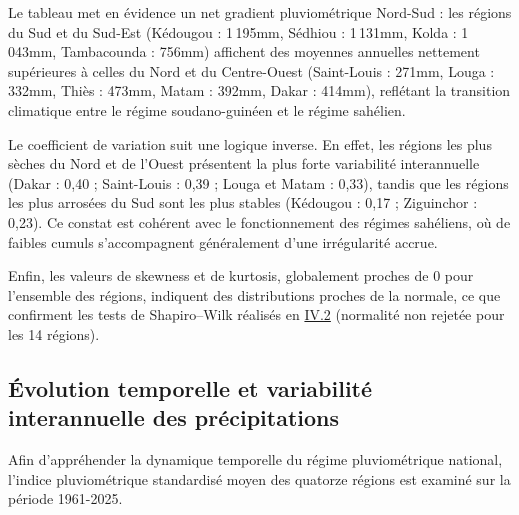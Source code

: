 \documentclass[12pt,a4paper]{report}
\begin{document}
Le tableau met en évidence un net gradient pluviométrique Nord-Sud : les régions du Sud et du Sud-Est (Kédougou : 1\,195mm, Sédhiou : 1\,131mm, Kolda : 1\,043mm, Tambacounda : 756mm) affichent des moyennes annuelles nettement supérieures à celles du Nord et du Centre-Ouest (Saint-Louis : 271mm, Louga : 332mm, Thiès : 473mm, Matam : 392mm, Dakar : 414mm), reflétant la transition climatique entre le régime soudano-guinéen et le régime sahélien.

Le coefficient de variation suit une logique inverse. En effet, les régions les plus sèches du Nord et de l'Ouest présentent la plus forte variabilité interannuelle (Dakar : 0,40 ; Saint-Louis : 0,39 ; Louga et Matam : 0,33), tandis que les régions les plus arrosées du Sud sont les plus stables (Kédougou : 0,17 ; Ziguinchor : 0,23). Ce constat est cohérent avec le fonctionnement des régimes sahéliens, où de faibles cumuls s'accompagnent généralement d'une irrégularité accrue.


Enfin, les valeurs de skewness et de kurtosis, globalement proches de 0 pour l'ensemble des régions, indiquent des distributions proches de la normale, ce que confirment les tests de Shapiro--Wilk réalisés en \hyperref[sec:analyse-ruptures]{IV.2} (normalité non rejetée pour les 14 régions).

\subsection{Évolution temporelle et variabilité interannuelle des précipitations}

Afin d'appréhender la dynamique temporelle du régime pluviométrique national, l'indice pluviométrique standardisé moyen des quatorze régions est examiné sur la période 1961-2025.
\end{document}
